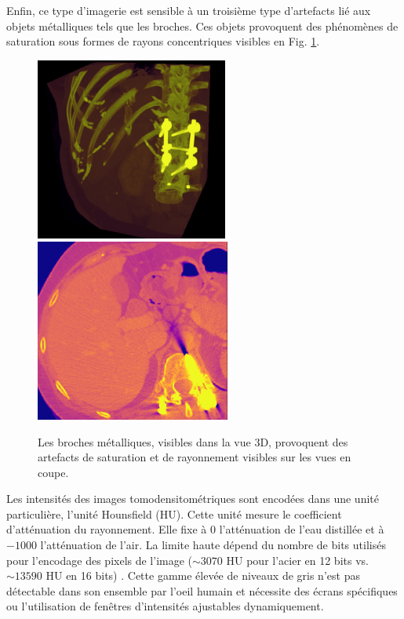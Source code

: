 Enfin, ce type d'imagerie est sensible à un troisième type d'artefacts lié aux objets métalliques tels que les broches. Ces objets provoquent des phénomènes de saturation sous formes de rayons concentriques visibles en Fig. \ref{fig:metallic artefacts}.

\begin{figure}
    \centering
    \includegraphics[height=6cm]{Images/broaches_CT.png}
    \includegraphics[height=6cm]{Images/broaches_CT_slice.png}
    \caption{Les broches métalliques, visibles dans la vue 3D, provoquent des artefacts de saturation et de rayonnement visibles sur les vues en coupe.}
    \label{fig:metallic artefacts}
\end{figure}

Les intensités des images tomodensitométriques sont encodées dans une unité particulière, l'unité Hounsfield (HU). Cette unité mesure le coefficient d'atténuation du rayonnement. Elle fixe à 0 l'atténuation de l'eau distillée et à $-1000$ l'atténuation de l'air. La limite haute dépend du nombre de bits utilisés pour l'encodage des pixels de l'image ($\sim 3070$ HU pour l'acier en 12 bits vs. $\sim 13590$ HU en 16 bits) \cite{Glide2013_metal_saturation}. Cette gamme élevée de niveaux de gris n'est pas détectable dans son ensemble par l'oeil humain et nécessite des écrans spécifiques ou l'utilisation de fenêtres d'intensités ajustables dynamiquement.

